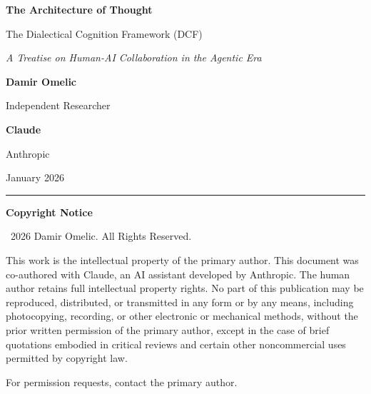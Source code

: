\documentclass[12pt,a4paper]{book}
\begin{document}

\begin{titlepage}
    \centering
    \vspace*{2cm}

    {\Huge\bfseries The Architecture of Thought\par}
    \vspace{0.5cm}
    {\LARGE The Dialectical Cognition Framework (DCF)\par}
    \vspace{1cm}
    {\Large\itshape A Treatise on Human-AI Collaboration in the Agentic Era\par}

    \vfill

    {\Large\bfseries Damir Omelic\par}
    \vspace{0.2cm}
    {\large Independent Researcher\par}
    \vspace{0.8cm}
    {\Large\bfseries Claude\par}
    \vspace{0.2cm}
    {\large Anthropic\par}

    \vfill

    {\large January 2026\par}

    \vspace{2cm}

    \hrule
    \vspace{0.5cm}
    {\small\textbf{Copyright Notice}\par}
    \vspace{0.3cm}
    {\small \textcopyright\ 2026 Damir Omelic. All Rights Reserved.\par}
    \vspace{0.2cm}
    {\small This work is the intellectual property of the primary author. This document was co-authored with Claude, an AI assistant developed by Anthropic. The human author retains full intellectual property rights. No part of this publication may be reproduced, distributed, or transmitted in any form or by any means, including photocopying, recording, or other electronic or mechanical methods, without the prior written permission of the primary author, except in the case of brief quotations embodied in critical reviews and certain other noncommercial uses permitted by copyright law.\par}
    \vspace{0.3cm}
    {\small For permission requests, contact the primary author.\par}

\end{titlepage}
\end{document}
